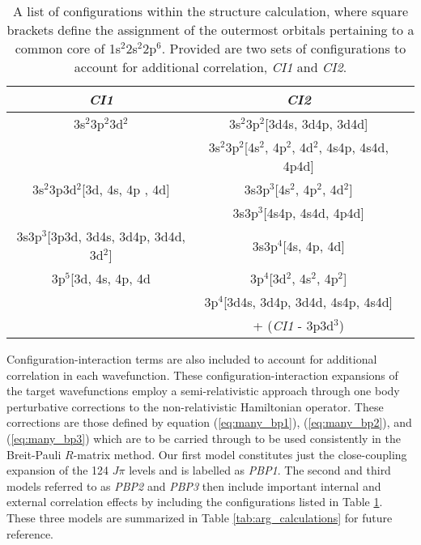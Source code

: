 %
\begin{table}[hbt]
\footnotesize
\begin{center}
\begin{tabular}{@{} l *2c @{}}
\toprule

\multicolumn{1}{c}{\textit{CI1}} & \multicolumn{1}{c}{\textit{CI2}}  \\

\midrule

       \multicolumn{1}{c}{3s$^2$3p$^2$3d$^2$} & 3s$^2$3p$^2$[3d4s, 3d4p, 3d4d] \\
       \multicolumn{1}{c}{} & 3s$^2$3p$^2$[4s$^2$, 4p$^2$, 4d$^2$, 4s4p, 4s4d, 4p4d] \\       
       \multicolumn{1}{c}{3s$^2$3p3d$^2$[3d, 4s, 4p , 4d]} & 3s3p$^3$[4s$^2$, 4p$^2$, 4d$^2$]\\  
       \multicolumn{1}{c}{} & 3s3p$^3$[4s4p, 4s4d, 4p4d]\\              
       \multicolumn{1}{c}{3s3p$^3$[3p3d, 3d4s, 3d4p, 3d4d, 3d$^2$]} & 3s3p$^4$[4s, 4p, 4d]\\              
       \multicolumn{1}{c}{3p$^5$[3d, 4s, 4p, 4d} & 3p$^4$[3d$^2$, 4s$^2$, 4p$^2$]\\
       \multicolumn{1}{c}{} & 3p$^4$[3d4s, 3d4p, 3d4d, 4s4p, 4s4d]\\             
       \multicolumn{1}{c}{} & + (\textit{CI1} - 3p3d$^3$)\\      


\bottomrule
 \end{tabular}
 \caption{A list of configurations within the structure calculation, where square brackets define the assignment of the outermost orbitals pertaining to a common core of 1s$^2$2s$^2$2p$^6$. Provided are two sets of configurations to account for additional correlation, \textit{CI1} and \textit{CI2}. \label{tab:arg_ci}}
 \end{center}
\end{table}
%

Configuration-interaction terms are also included to account for additional correlation in each wavefunction. These configuration-interaction expansions of the target wavefunctions employ a semi-relativistic approach through one body perturbative corrections to the non-relativistic Hamiltonian operator. These corrections are those defined by equation (\ref{eq:many_bp1}), (\ref{eq:many_bp2}), and (\ref{eq:many_bp3}) which are to be carried through to be used consistently in the Breit-Pauli $R$-matrix method. Our first model constitutes just the close-coupling expansion of the 124 $J\pi$ levels and is labelled as \textit{PBP1}. The second and third models referred to as \textit{PBP2} and \textit{PBP3} then include important internal and external correlation effects by including the configurations listed in Table \ref{tab:arg_ci}. These three models are summarized in Table \ref{tab:arg_calculations} for future reference.

